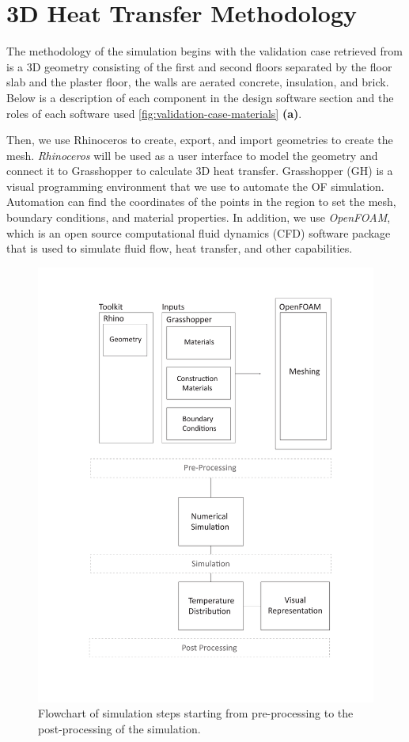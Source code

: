 
\chapter{3D Heat Transfer Methodology}

The methodology of the simulation begins with the validation case retrieved from \cite{ISO} is a 3D geometry consisting of the first and second floors separated by the floor slab and the plaster floor, the walls are aerated concrete, insulation, and brick. 
Below is a description of each component in the design software section and the roles of each software used \ref{fig:validation-case-materials} \textbf{(a)}.


Then, we use Rhinoceros to create, export, and import geometries to create the mesh. 
\textit{Rhinoceros} will be used as a user interface to model the geometry and connect it to Grasshopper to calculate 3D heat transfer.
Grasshopper (GH) is a visual programming environment that we use to automate the OF simulation. Automation can find the coordinates of the points in the region to set the mesh, boundary conditions, and material properties. 
In addition, we use \textit{OpenFOAM}, which is an open source computational fluid dynamics (CFD) software package that is used to simulate fluid flow, heat transfer, and other capabilities. 


   
\begin{figure}[H]
     \centering
    \includegraphics[trim=2.7cm 1.7cm 2.7cm 1.5cm, clip, width=0.7\linewidth]{Figures/flowchartv.pdf}
     \caption[Simulation Flowchart]{Flowchart of simulation steps starting from pre-processing to the post-processing of the simulation.}
   \label{fig:flowchart}
 \end{figure}



